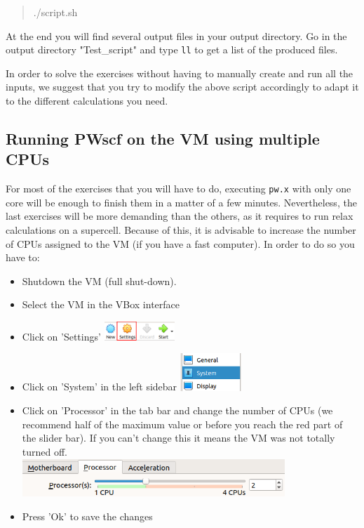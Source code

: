 \documentclass[12pt]{article}
\newcommand{\code}[1]{
\begin{quotation}
  #1 
\end{quotation}
}
\begin{document}
    \code{./script.sh}

    At the end you will find several output files in your output directory. Go in the output directory "Test\_script" and type {\tt ll} to get a list of the produced files.

    In order to solve the exercises without having to manually create and run all the
    inputs, we suggest that you try to modify the above script accordingly to adapt
    it to the different calculations you need.

\newpage
\subsection{Running PWscf on the VM using multiple CPUs}
    For most of the exercises that you will have to do, executing \texttt{pw.x} with only
    one core will be enough to finish them in a matter of a few minutes.
    Nevertheless, the last exercises will be more demanding than the others, as it requires
    to run relax calculations on a supercell.
    Because of this, it is advisable to increase the number of CPUs
    assigned to the VM (if you have a fast computer).
    In order to do so you have to:
    \begin{itemize}
      \item Shutdown the VM (full shut-down).
      \item Select the VM in the VBox interface
      \item Click on 'Settings' \includegraphics[height=20pt]{settings.png}
      \item Click on 'System' in the left sidebar \includegraphics[height=40pt]{system.png}
      \item Click on 'Processor' in the tab bar and change  the number of CPUs (we recommend half of the maximum value or before you reach the red part of the slider bar). If you can't change this it means the VM was not totally turned off. \\
      \includegraphics[height=40pt]{processors.png}
      \item Press 'Ok' to save the changes
    \end{itemize}
\end{document}
